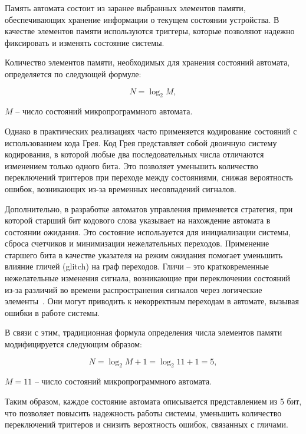 Память автомата состоит из заранее выбранных элементов памяти, обеспечивающих 
хранение информации о текущем состоянии устройства. В качестве элементов памяти 
используются триггеры, которые позволяют надежно фиксировать и изменять 
состояние системы.  

Количество элементов памяти, необходимых для хранения состояний автомата, 
определяется по следующей формуле:

\begin{equation}
    N = \log_{2}{M},
\end{equation}

 $M$ – число состояний микропрограммного автомата.  

Однако в практических реализациях часто применяется кодирование состояний с 
использованием кода Грея. Код Грея представляет собой двоичную систему 
кодирования, в которой любые два последовательных числа отличаются изменением 
только одного бита\cite{Tokheim2003}. Это позволяет уменьшить количество 
переключений триггеров при переходе между состояниями, снижая вероятность 
ошибок, возникающих из-за временных несовпадений сигналов.  


Дополнительно, в разработке автоматов управления применяется стратегия, при 
которой старший бит кодового слова указывает на нахождение автомата в состоянии
ожидания. Это состояние используется для инициализации системы, сброса 
счетчиков и минимизации нежелательных переходов. Применение старшего 
бита в качестве указателя на режим ожидания помогает уменьшить влияние гличей 
(glitch) на граф переходов. Гличи – это кратковременные нежелательные изменения
сигнала, возникающие при переключении состояний из-за различий во времени 
распространения сигналов через логические элементы~\cite{Katz1994}. Они могут 
приводить к некорректным переходам в автомате, вызывая ошибки в работе системы.  

В связи с этим, традиционная формула определения числа элементов памяти 
модифицируется следующим образом:

\begin{equation}
    N = \log_{2}{M} + 1 = \log_{2}{11} + 1 = 5,
\end{equation}

 $M = 11$ – число состояний микропрограммного автомата.  

Таким образом, каждое состояние автомата описывается представлением из 5 бит, 
что позволяет повысить надежность работы системы, уменьшить количество 
переключений триггеров и снизить вероятность ошибок, связанных с гличами.  

